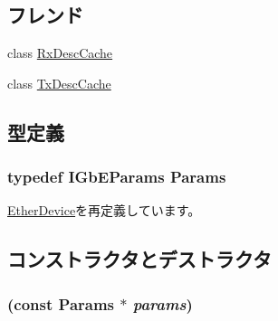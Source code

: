 \subsection*{フレンド}
\begin{DoxyCompactItemize}
\item 
class \hyperlink{classIGbE_a5117ecf4d368d174c17a9304676a45a5}{RxDescCache}
\item 
class \hyperlink{classIGbE_ab83c1d837daa8ccbbd651c133208ced0}{TxDescCache}
\end{DoxyCompactItemize}


\subsection{型定義}
\hypertarget{classIGbE_ad27b5cfed87f35a483863a73336d8258}{
\subsubsection[{Params}]{\setlength{\rightskip}{0pt plus 5cm}typedef IGbEParams {\bf Params}}}
\label{classIGbE_ad27b5cfed87f35a483863a73336d8258}


\hyperlink{classEtherDevice_afcf43c7944288000e850f783bdd66b9d}{EtherDevice}を再定義しています。

\subsection{コンストラクタとデストラクタ}
\hypertarget{classIGbE_a3e3eef81d3caf789558505740ce0ed07}{
\subsubsection[{IGbE}]{ (const {\bf Params} $\ast$ {\em params})}}
\label{classIGbE_a3e3eef81d3caf789558505740ce0ed07}



